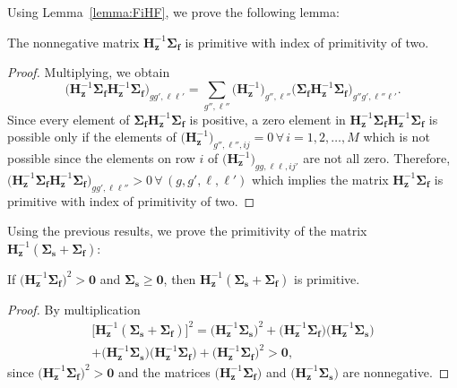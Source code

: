 Using Lemma~\ref{lemma:FiHF}, we prove the following lemma:
\begin{lemma}
	The nonnegative matrix $\mathbf{H}_{\mathbf{z}}^{-1} \mathbf{\Sigma_{f}}$ is primitive with index of primitivity of two.
\end{lemma}
\begin{proof}
	Multiplying, we obtain
	\begin{equation}
	\big ( \mathbf{H}_{\mathbf{z}}^{-1} \mathbf{\Sigma_{f}} \mathbf{H}_{\mathbf{z}}^{-1} \mathbf{\Sigma_{f}} \big )_{gg',\ell \ell'} = \sum_{g'',\ell''} \big ( \mathbf{H}_{\mathbf{z}}^{-1} \big )_{g'',\ell''} \big ( \mathbf{\Sigma_{f}}\mathbf{H}_{\mathbf{z}}^{-1}\mathbf{\Sigma_{f}} \big )_{g''g',\ell'' \ell'}.
	\end{equation}
Since every element of $\mathbf{\Sigma_{f}}\mathbf{H}_{\mathbf{z}}^{-1}\mathbf{\Sigma_{f}}$ is positive, a zero element in $\mathbf{H}_{\mathbf{z}}^{-1} \mathbf{\Sigma_{f}} \mathbf{H}_{\mathbf{z}}^{-1} \mathbf{\Sigma_{f}}$ is possible only if the elements of $\big ( \mathbf{H}_{\mathbf{z}}^{-1} \big )_{g'',\ell'',ij} = 0 \, \forall \, i = 1, 2, \dots, M$ which is not possible since the elements on row $i$ of $\big ( \mathbf{H}_{\mathbf{z}}^{-1} \big )_{gg,\ell\ell,ij'}$ are not all zero. Therefore, $\big ( \mathbf{H}_{\mathbf{z}}^{-1} \mathbf{\Sigma_{f}} \mathbf{H}_{\mathbf{z}}^{-1} \mathbf{\Sigma_{f}} \big )_{gg',\ell \ell''} > 0 \, \forall \, (g,g',\ell, \ell')$ which implies the matrix $\mathbf{H}_{\mathbf{z}}^{-1} \mathbf{\Sigma_{f}}$ is primitive with index of primitivity of two.
\end{proof}

Using the previous results, we prove the primitivity of the matrix $\mathbf{H}_{\mathbf{z}}^{-1}( \mathbf{\Sigma_{s}} + \mathbf{\Sigma_{f}} )$:
\begin{theorem}
	If $\big ( \mathbf{H}_{\mathbf{z}}^{-1} \mathbf{\Sigma_{f}} \big )^{2} > \mathbf{0}$ and $\mathbf{\Sigma_{s}} \geq \mathbf{0}$, then $\mathbf{H}_{\mathbf{z}}^{-1}( \mathbf{\Sigma_{s}} + \mathbf{\Sigma_{f}} )$ is primitive.
\end{theorem}
\begin{proof}
By multiplication
	\begin{multline}
		\big [ \mathbf{H}_{\mathbf{z}}^{-1}( \mathbf{\Sigma_{s}} + \mathbf{\Sigma_{f}} ) \big ]^{2} = \big ( \mathbf{H}_{\mathbf{z}}^{-1} \mathbf{\Sigma_{s}} \big )^{2} + \big ( \mathbf{H}_{\mathbf{z}}^{-1} \mathbf{\Sigma_{f}} \big )\big ( \mathbf{H}_{\mathbf{z}}^{-1} \mathbf{\Sigma_{s}} \big ) \\ + \big ( \mathbf{H}_{\mathbf{z}}^{-1} \mathbf{\Sigma_{s}} \big )\big ( \mathbf{H}_{\mathbf{z}}^{-1} \mathbf{\Sigma_{f}} \big ) + \big ( \mathbf{H}_{\mathbf{z}}^{-1} \mathbf{\Sigma_{f}} \big )^{2} > \mathbf{0},
	\end{multline}
	since $\big ( \mathbf{H}_{\mathbf{z}}^{-1} \mathbf{\Sigma_{f}} \big )^{2} > \mathbf{0}$ and the matrices $\big ( \mathbf{H}_{\mathbf{z}}^{-1} \mathbf{\Sigma_{f}} \big )$ and $\big ( \mathbf{H}_{\mathbf{z}}^{-1} \mathbf{\Sigma_{s}} \big )$ are nonnegative.
\end{proof}

